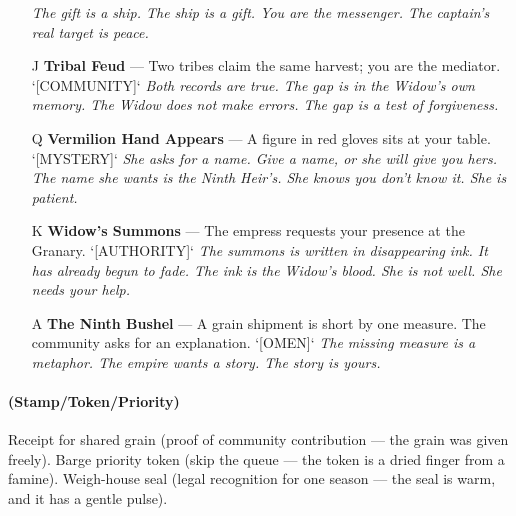 \begin{enumerate}
  \hfill \textit{The gift is a ship. The ship is a gift. You are the messenger. The captain's real target is peace.}
\item[J] \textbf{Tribal Feud} --- Two tribes claim the same harvest; you are the mediator. `[COMMUNITY]`
  \hfill \textit{Both records are true. The gap is in the Widow's own memory. The Widow does not make errors. The gap is a test of forgiveness.}
\item[Q] \textbf{Vermilion Hand Appears} --- A figure in red gloves sits at your table. `[MYSTERY]`
  \hfill \textit{She asks for a name. Give a name, or she will give you hers. The name she wants is the Ninth Heir's. She knows you don't know it. She is patient.}
\item[K] \textbf{Widow's Summons} --- The empress requests your presence at the Granary. `[AUTHORITY]`
  \hfill \textit{The summons is written in disappearing ink. It has already begun to fade. The ink is the Widow's blood. She is not well. She needs your help.}
\item[A] \textbf{The Ninth Bushel} --- A grain shipment is short by one measure. The community asks for an explanation. `[OMEN]`
  \hfill \textit{The missing measure is a metaphor. The empire wants a story. The story is yours.}
\end{enumerate}

\paragraph*{(Stamp/Token/Priority)} Receipt for shared grain (proof of community contribution --- the grain was given freely). Barge priority token (skip the queue --- the token is a dried finger from a famine). Weigh-house seal (legal recognition for one season --- the seal is warm, and it has a gentle pulse).

